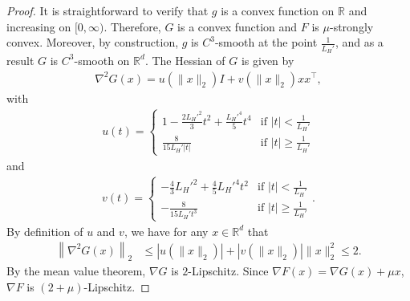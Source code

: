 \documentclass[11pt,twoside]{article}
\numberwithin{equation}{section}
\newcommand{\norm}[1] {\left \| #1 \right \|}
\newcommand{\RR}{\mathbb{R}}
\newcommand{\1}{\mathbf{1}}
\theoremstyle{remark}
\theoremstyle{plain}
\newcommand{\liph}{L_H}
\begin{document}
\begin{proof}
	It is straightforward to verify that $g$ is a convex function on $\RR$ and increasing on $[0,\infty)$. Therefore, $G$ is a convex function and $ F$ is $\mu$-strongly convex. Moreover, by construction, $g$ is $C^3$-smooth at the point $\frac{1}{\liph'}$, and as a result $G$ is $C^3$-smooth on $\mathbb{R}^d$. The Hessian of \(G\) is given by
	\begin{align*}
		\nabla^2 G(x)= u(\|x\|_2) I + v(\|x\|_2) xx^\top,
	\end{align*}		
	with
	\begin{align*}
		u(t)= \begin{cases}
			1-\frac{2\liph'^2}{3} t^2 + \frac{\liph'^4}{5}t^4 &\text{if } |t|<\frac{1}{\liph'}\\
			\frac{8}{15\liph' |t|} & 	\text{if } |t|\ge\frac{1}{\liph'}
		\end{cases}
	\end{align*}
	and 
	\begin{align*}
		v(t)= \begin{cases}
			-\frac{4}{3} \liph'^2 + \frac{4}{5} \liph'^4 t^2 &\text{if } |t|<\frac{1}{\liph'}\\
			- \frac{8}{15 \liph' t^3}  & 	\text{if }|t|\ge\frac{1}{\liph'}
		\end{cases}.
	\end{align*}
	By definition of $u$ and $v$, we have for any $x \in \RR^d$ that
	\begin{align*}
		\norm{\nabla^2 G(x)}_2 &\le |u(\|x\|_2)| + |v(\|x\|_2)| \|x\|_2^2 \le 2.
	\end{align*}
	By the mean value theorem, $\nabla G$ is $2$-Lipschitz. Since $\nabla  F(x) = \nabla G(x) + \mu x$, $\nabla F$ is $(2+ \mu)$-Lipschitz.
	

\end{proof}
\end{document}
